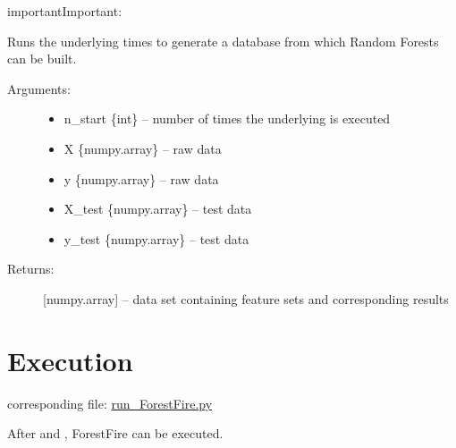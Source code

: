 \documentclass[letterpaper,10pt,english]{sphinxmanual}
\begin{document}
\begin{sphinxadmonition}{important}{Important:}
\begin{fulllineitems}
\label{\detokenize{Generate_Database:ForestFire.Main.gen_database}}
Runs the underlying {\hyperref[\detokenize{Overview:mla}]{}}  times to generate a database from which Random Forests can be built.
\begin{description}
\item[{Arguments:}] \leavevmode\begin{itemize}
\item {} 
n\_start \{int\} -- number of times the underlying {\hyperref[\detokenize{Overview:mla}]{}} is executed

\item {} 
X \{numpy.array\} -- raw data

\item {} 
y \{numpy.array\} -- raw data

\item {} 
X\_test \{numpy.array\} -- test data

\item {} 
y\_test \{numpy.array\} -- test data

\end{itemize}

\item[{Returns:}] \leavevmode
{[}numpy.array{]} -- data set containing feature sets and corresponding results

\end{description}

\end{fulllineitems}

\end{sphinxadmonition}


\section{Execution}
\label{\detokenize{execution:execution}}\label{\detokenize{execution::doc}}\label{\detokenize{execution:id1}}
corresponding file: \href{https://github.com/weinertmos/ForestFire/blob/master/source/ForestFire/run\_ForestFire.py}{run\_ForestFire.py}

After {\hyperref[\detokenize{Importing_Data:import-data}]{}} and {\hyperref[\detokenize{Generate_Database:compute}]{}}, ForestFire can be executed.
\end{document}
